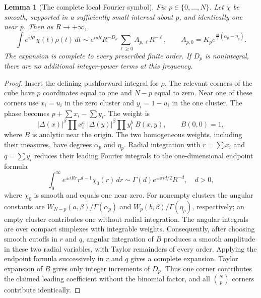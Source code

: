 \documentclass[11pt,a4paper]{article}
\newtheorem{lemma}[theorem]{Lemma}
\theoremstyle{definition}
\theoremstyle{remark}
\numberwithin{equation}{section}
\begin{document}
\begin{lemma}[The complete local Fourier symbol]
\label{p2:lem:JC-symbol}
Fix $p\in\{0,\ldots,N\}$.  Let $\chi$ be smooth, supported in a
sufficiently small interval about $p$, and identically one near $p$.  Then as $R\to+\infty$,
\begin{equation}\label{p2:eq:JC-local-Fourier}
 \int e^{iRt}\chi(t)\rho(t)\,dt
 \sim e^{ipR}R^{-D_p}\sum_{\ell\ge0}A_{p,\ell}R^{-\ell},
 \qquad
 A_{p,0}=K_p e^{\frac{\pi i}{2}(\alpha_p-\eta_p)}.
\end{equation}
The expansion is complete to every prescribed finite order.
If $D_p$ is nonintegral, there are no additional integer-power terms
at this frequency.
\end{lemma}

\begin{proof}
Insert the defining pushforward integral for $\rho$.  The relevant
corners of the cube have $p$ coordinates equal to one and $N-p$
equal to zero.  Near one of these corners use $x_i=u_i$ in the
zero cluster and $y_i=1-u_i$ in the one cluster.  The phase becomes
$p+\sum x_i-\sum y_i$.  The weight is
\[
 |\Delta(x)|^\beta\prod x_i^a\;
 |\Delta(y)|^\beta\prod y_i^b\;B(x,y),
 \qquad B(0,0)=1,
\]
where $B$ is analytic near the origin.  The two homogeneous weights,
including their measures, have degrees $\alpha_p$ and $\eta_p$.
Radial integration with $r=\sum x_i$ and $q=\sum y_i$ reduces their
leading Fourier integrals to the one-dimensional endpoint formula
\[
 \int_0^\infty e^{\pm iRr}r^{d-1}\chi_0(r)\,dr
     \sim \Gamma(d)e^{\pm\pi i d/2}R^{-d},
 \quad d>0,
\]
where $\chi_0$ is smooth and equals one near zero.  For nonempty clusters the angular constants are
$W_{N-p}(a,\beta)/\Gamma(\alpha_p)$ and
$W_p(b,\beta)/\Gamma(\eta_p)$, respectively; an empty cluster
contributes one without radial integration.  The angular integrals
are over compact simplexes with integrable weights.  Consequently,
after choosing smooth cutoffs in $r$ and $q$, angular integration
of $B$ produces a smooth amplitude in these two radial variables,
with Taylor remainders of every order.  Applying the endpoint
formula successively in $r$ and $q$ gives a complete expansion.
Taylor expansion of $B$ gives only integer increments of $D_p$.
Thus one corner contributes the claimed leading coefficient without
the binomial factor, and all $\binom Np$ corners contribute identically.


\end{proof}
\end{document}
